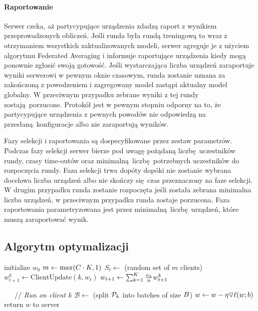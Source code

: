 \paragraph{Raportowanie}
Serwer czeka, aż partycypujące urządzenia zdadzą raport z wynikiem przeprowadzonych obliczeń. Jeśli runda była rundą treningową to wraz z otrzymaniem wszystkich zaktualizowanych modeli, serwer agreguje je z użyciem algorytmu Federated Averaging i informuje raportujące urządzenia kiedy mogą ponownie zgłosić swoją gotowość. Jeśli wystarczająca liczba urządzeń zaraportuje wyniki serwerowi w pewnym oknie czasowym, runda zostanie uznana za zakończoną z powodzeniem i zagregowany model zastąpi aktualny model globalny. W przeciwnym przypadku zebrane wyniki z tej rundy zostają porzucone. Protokół jest w pewnym stopniu odporny na to, że partycypujące urządzenia z pewnych powodów nie odpowiedzą na przesłaną konfiguracje albo nie zaraportują wyników.

Fazy selekcji i raportowania są dospecyfikowane przez zestaw parametrów. Podczas fazy selekcji  serwer bierze pod uwagę pożądaną liczbę uczestników rundy, czasy time-outów oraz minimalną liczbę potrzebnych uczestników do rozpoczęcia rundy. Faza selekcji trwa dopóty dopóki nie zostanie wybrana docelowa liczba urządzeń albo nie skończy się czas przeznaczony na faze selekcji. W drugim przypadku runda zostanie rozpoczęta jeśli została zebrana minimalna liczba urządzeń, w przeciwnym przypadku runda zostaje porzucona. Faza raportowania parametryzowana jest przez minimalną liczbę urządzeń, które muszą zaraportować wynik.


\subsection{Algorytm optymalizacji}

  \begin{polishalgorithm}[t]
    \begin{algorithmic}
      \STATE{} initialize $w_0$
        \STATE{} $m \leftarrow \max(C\cdot K, 1)$
        \STATE{} $S_t \leftarrow$ (random set of $m$ clients)
          \STATE{} $w_{t+1}^k \leftarrow \text{ClientUpdate}(k, w_t)$ 
        \ENDFOR{}
        \STATE{} $w_{t+1} \leftarrow \sum_{k=1}^K \frac{n_k}{n} w_{t+1}^k$
      \ENDFOR{}
      \STATE{}
    
    \ \ \  // \emph{Run on client $k$}
      \STATE{} $\mathcal{B} \leftarrow$ (split $\mathcal{P}_k$ into batches of size $B$)
          \STATE{} $w \leftarrow w - \eta \triangledown \ell(w; b)$
        \ENDFOR{}
    \ENDFOR{}
    \STATE{} return $w$ to server
    \end{algorithmic}
    \label{alg:fedavg}
    \end{polishalgorithm}


